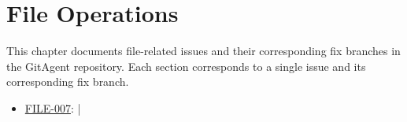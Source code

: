 \chapter{File Operations}
\label{chap:file}

This chapter documents file-related issues and their corresponding fix branches in the GitAgent repository. Each section corresponds to a single issue and its corresponding fix branch.

\begin{itemize}
    \item \hyperref[sec:file-007]{FILE-007}:  | 
\end{itemize}


